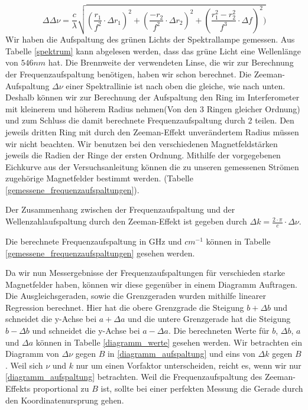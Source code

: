 \documentclass[10pt,a4paper]{article}
\begin{document}
\begin{equation}
\Delta\Delta\nu = \frac{c}{\lambda} \sqrt{(\frac{r_1}{f^2} \cdot\Delta r_1)^2 + (\frac{-r_2}{f^2}\cdot \Delta r_2)^2 + (\frac{r_1^2 - r_2^2}{f^3} \cdot \Delta f)^2)}
\label{fehler123}
\end{equation}
 Wir haben die Aufspaltung des grünen Lichts der Spektrallampe gemessen. Aus Tabelle \ref{spektrum} kann abgelesen werden, dass das grüne Licht eine Wellenlänge von $546 nm$ hat. Die Brennweite der verwendeten Linse, die wir zur Berechnung der Frequenzaufspaltung benötigen, haben wir schon berechnet.
Die Zeeman-Aufspaltung $\Delta\nu$ einer Spektrallinie ist nach oben die gleiche, wie nach unten. Deshalb können wir zur Berechnung der Aufspaltung den Ring im Interferometer mit kleinerem und höherem Radius nehmen(Von den 3 Ringen gleicher Ordnung) und zum Schluss die damit berechnete Frequenzaufspaltung durch 2 teilen. Den jeweils dritten Ring mit durch den Zeeman-Effekt unverändertem Radius müssen wir nicht beachten. Wir benutzen bei den verschiedenen Magnetfeldstärken jeweils die Radien der Ringe der ersten Ordnung. 
Mithilfe der vorgegebenen Eichkurve aus der Versuchsanleitung können die zu unseren gemessenen Strömen zugehörige Magnetfelder bestimmt werden. (Tabelle \ref{gemessene_frequenzaufspaltungen}).

Der Zusammenhang zwischen der Frequenzaufspaltung und der Wellenzahlaufspaltung durch den Zeeman-Effekt ist gegeben durch $\Delta k = \frac{2 \cdot \pi}{c} \cdot \Delta\nu$.

Die berechnete Frequenzaufspaltung in GHz und $cm^{-1}$ können in Tabelle \ref{gemessene_frequenzaufspaltungen} gesehen werden.

Da wir nun Messergebnisse der Frequenzaufspaltungen für verschieden starke Magnetfelder haben, können wir diese gegenüber in einem Diagramm Auftragen. Die Ausgleichsgeraden, sowie die Grenzgeraden wurden mithilfe linearer Regression berechnet. Hier hat die obere Grenzgrade die Steigung $b + \Delta b$ und schneidet die y-Achse bei $a + \Delta a$ und die untere Grenzgerade hat die Steigung $b - \Delta b$ und schneidet die y-Achse bei $a - \Delta a$. Die berechneten Werte für $b$, $\Delta b$, $a$ und $\Delta a$ können in Tabelle \ref{diagramm_werte} gesehen werden.
 Wir betrachten ein Diagramm von $\Delta\nu$ gegen $B$ in \ref{diagramm_aufspaltung} und eins von $\Delta k$ gegen $B$. Weil sich $\nu$ und $k$ nur um einen Vorfaktor unterscheiden, reicht es, wenn wir nur \ref{diagramm_aufspaltung} betrachten.
Weil die Frequenzaufspaltung des Zeeman-Effekts proportional zu $B$ ist, sollte bei einer perfekten Messung die Gerade durch den Koordinatenursprung gehen.
\end{document}
